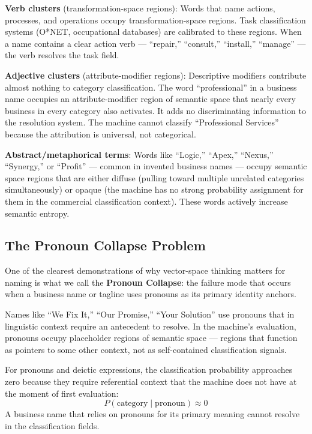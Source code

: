 \documentclass[12pt, openany]{book}
\theoremstyle{thmstyle}
\theoremstyle{defstyle}
\begin{document}
\textbf{Verb clusters} (transformation-space regions): Words that name actions, processes, and operations occupy transformation-space regions. Task classification systems (O*NET, occupational databases) are calibrated to these regions. When a name contains a clear action verb --- ``repair,'' ``consult,'' ``install,'' ``manage'' --- the verb resolves the task field.

\textbf{Adjective clusters} (attribute-modifier regions): Descriptive modifiers contribute almost nothing to category classification. The word ``professional'' in a business name occupies an attribute-modifier region of semantic space that nearly every business in every category also activates. It adds no discriminating information to the resolution system. The machine cannot classify ``Professional Services'' because the attribution is universal, not categorical.

\textbf{Abstract/metaphorical terms}: Words like ``Logic,'' ``Apex,'' ``Nexus,'' ``Synergy,'' or ``Profit'' --- common in invented business names --- occupy semantic space regions that are either diffuse (pulling toward multiple unrelated categories simultaneously) or opaque (the machine has no strong probability assignment for them in the commercial classification context). These words actively increase semantic entropy.

\subsection{The Pronoun Collapse Problem}

One of the clearest demonstrations of why vector-space thinking matters for naming is what we call the \textbf{Pronoun Collapse}: the failure mode that occurs when a business name or tagline uses pronouns as its primary identity anchors.

Names like ``We Fix It,'' ``Our Promise,'' ``Your Solution'' use pronouns that in linguistic context require an antecedent to resolve. In the machine's evaluation, pronouns occupy placeholder regions of semantic space --- regions that function as pointers to some other context, not as self-contained classification signals.

\begin{keybox}
For pronouns and deictic expressions, the classification probability approaches zero because they require referential context that the machine does not have at the moment of first evaluation:
\[
P(\text{category} \mid \text{pronoun}) \approx 0
\]
A business name that relies on pronouns for its primary meaning cannot resolve in the classification fields.
\end{keybox}
\end{document}
